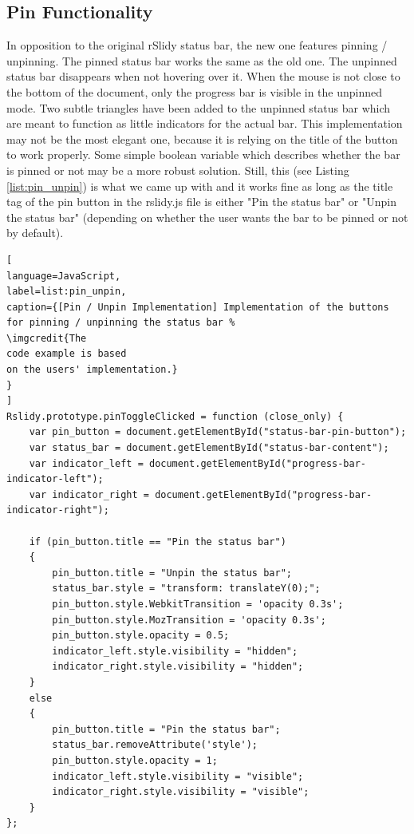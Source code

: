 \subsection{Pin Functionality}
In opposition to the original rSlidy status bar, the new one features pinning / unpinning. The pinned status bar works the same as the old one. The unpinned status bar disappears when not hovering over it. When the mouse is not close to the bottom of the document, only the progress bar is visible in the unpinned mode. Two subtle triangles have been added to the unpinned status bar which are meant to function as little indicators for the actual bar. This implementation may not be the most elegant one, because it is relying on the title of the button to work properly. Some simple boolean variable which describes whether the bar is pinned or not may be a more robust solution. Still, this (see Listing \ref{list:pin_unpin}) is what we came up with and it works fine as long as the title tag of the pin button in the rslidy.js file is either "Pin the status bar" or "Unpin the status bar" (depending on whether the user wants the bar to be pinned or not by default).


\begin{minipage}{\linewidth}
\begin{lstlisting}[
language=JavaScript,
label=list:pin_unpin,
caption={[Pin / Unpin Implementation] Implementation of the buttons for pinning / unpinning the status bar %
\imgcredit{The 
code example is based 
on the users' implementation.}
}
]
Rslidy.prototype.pinToggleClicked = function (close_only) {
	var pin_button = document.getElementById("status-bar-pin-button");
	var status_bar = document.getElementById("status-bar-content");
	var indicator_left = document.getElementById("progress-bar-indicator-left");
	var indicator_right = document.getElementById("progress-bar-indicator-right");

	if (pin_button.title == "Pin the status bar")
	{
		pin_button.title = "Unpin the status bar";
		status_bar.style = "transform: translateY(0);";
		pin_button.style.WebkitTransition = 'opacity 0.3s';
		pin_button.style.MozTransition = 'opacity 0.3s';
		pin_button.style.opacity = 0.5;
		indicator_left.style.visibility = "hidden";
		indicator_right.style.visibility = "hidden";
	}
	else
	{			
		pin_button.title = "Pin the status bar";
		status_bar.removeAttribute('style');
		pin_button.style.opacity = 1;
		indicator_left.style.visibility = "visible";
		indicator_right.style.visibility = "visible";
	}
};
\end{lstlisting}
\end{minipage}

